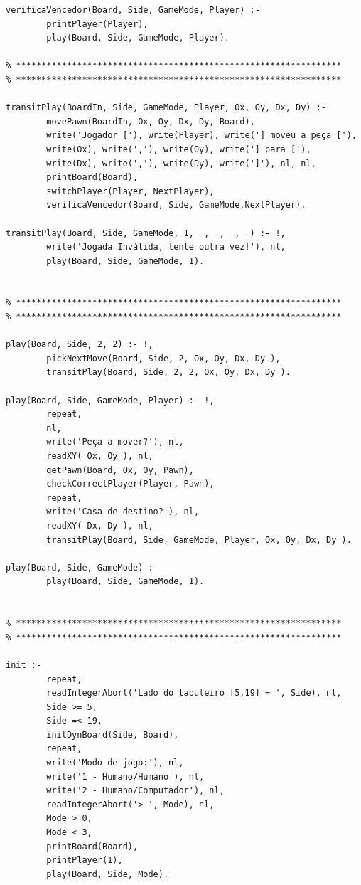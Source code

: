\documentclass[15pt,a4paper]{article}
\begin{document}
\begin{lstlisting}
verificaVencedor(Board, Side, GameMode, Player) :-
		printPlayer(Player),
		play(Board, Side, GameMode, Player).
	
% ****************************************************************
% ****************************************************************

transitPlay(BoardIn, Side, GameMode, Player, Ox, Oy, Dx, Dy) :-
		movePawn(BoardIn, Ox, Oy, Dx, Dy, Board),
		write('Jogador ['), write(Player), write('] moveu a peça ['),
		write(Ox), write(','), write(Oy), write('] para ['),
		write(Dx), write(','), write(Dy), write(']'), nl, nl,
		printBoard(Board),
		switchPlayer(Player, NextPlayer),
		verificaVencedor(Board, Side, GameMode,NextPlayer).

transitPlay(Board, Side, GameMode, 1, _, _, _, _) :- !,
		write('Jogada Inválida, tente outra vez!'), nl,
		play(Board, Side, GameMode, 1).


% ****************************************************************
% ****************************************************************

play(Board, Side, 2, 2) :- !,
		pickNextMove(Board, Side, 2, Ox, Oy, Dx, Dy ),
		transitPlay(Board, Side, 2, 2, Ox, Oy, Dx, Dy ).

play(Board, Side, GameMode, Player) :- !,
		repeat,
		nl,
		write('Peça a mover?'), nl,
		readXY( Ox, Oy ), nl,
		getPawn(Board, Ox, Oy, Pawn),
		checkCorrectPlayer(Player, Pawn),
		repeat,
		write('Casa de destino?'), nl,	
		readXY( Dx, Dy ), nl,
		transitPlay(Board, Side, GameMode, Player, Ox, Oy, Dx, Dy ).
	
play(Board, Side, GameMode) :-
		play(Board, Side, GameMode, 1).


% ****************************************************************
% ****************************************************************
	
init :-
		repeat,
		readIntegerAbort('Lado do tabuleiro [5,19] = ', Side), nl,
		Side >= 5,
		Side =< 19,
		initDynBoard(Side, Board),
		repeat,
		write('Modo de jogo:'), nl,
		write('1 - Humano/Humano'), nl,
		write('2 - Humano/Computador'), nl,
		readIntegerAbort('> ', Mode), nl,
		Mode > 0,
		Mode < 3,
		printBoard(Board),
		printPlayer(1),
		play(Board, Side, Mode).


\end{lstlisting}
\end{document}
